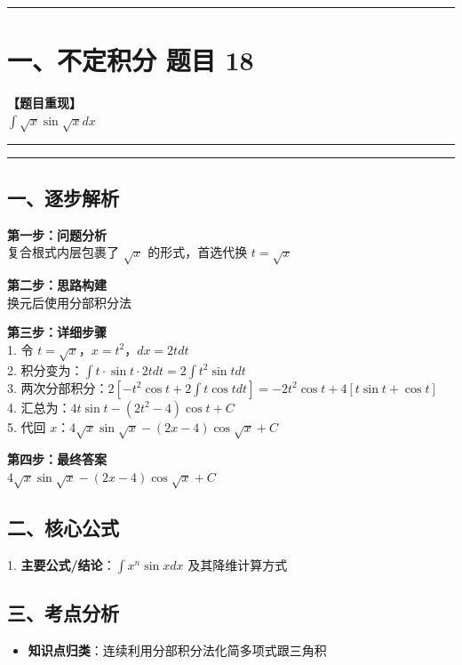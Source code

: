 ﻿\documentclass[12pt, a4paper]{ctexart}
\newcommand{\TopSeparator}{
    \par\noindent\rule{\textwidth}{1.5pt}\vspace{0.5em}
}
\newcommand{\AnalysisSeparator}{
    \par\noindent\rule{\textwidth}{0.5pt}\vspace{0.2em}\hrule\vspace{0.5em}
}
\newenvironment{RedAnalysis}{
    \par
    \color{red} 
}{
    \par
    \color{black} 
}
\begin{document}
\vspace{2em}

\TopSeparator
\section*{一、不定积分 题目 18}

\textbf{【题目重现】} \\
$\int \sqrt{x} \sin \sqrt{x} dx$

\AnalysisSeparator

\begin{RedAnalysis}

	\subsection*{一、逐步解析}

	\textbf{第一步：问题分析} \\
	复合根式内层包裹了 $\sqrt{x}$ 的形式，首选代换 $t=\sqrt{x}$

	\textbf{第二步：思路构建} \\
	换元后使用分部积分法

	\textbf{第三步：详细步骤} \\
	1. 令 $t = \sqrt{x}$，$x = t^2$，$dx = 2t dt$ \\ 
	2. 积分变为：$\int t \cdot \sin t \cdot 2t dt = 2\int t^2\sin t dt$ \\ 
	3. 两次分部积分：$2[ -t^2\cos t + 2\int t\cos t dt ] = -2t^2\cos t + 4[ t\sin t + \cos t ]$ \\ 
	4. 汇总为：$4t\sin t - (2t^2-4)\cos t + C$ \\ 
	5. 代回 $x$：$4\sqrt{x}\sin\sqrt{x} - (2x-4)\cos\sqrt{x} + C$

	\textbf{第四步：最终答案} \\
	$4\sqrt{x}\sin\sqrt{x} - (2x-4)\cos\sqrt{x} + C$

	\subsection*{二、核心公式}
	1. \textbf{主要公式/结论}：$\int x^n \sin x dx \text{ 及其降维计算方式}$

	\subsection*{三、考点分析}
	\begin{itemize}
		\item \textbf{知识点归类}：连续利用分部积分法化简多项式跟三角积
	\end{itemize}

\end{RedAnalysis}
\end{document}
